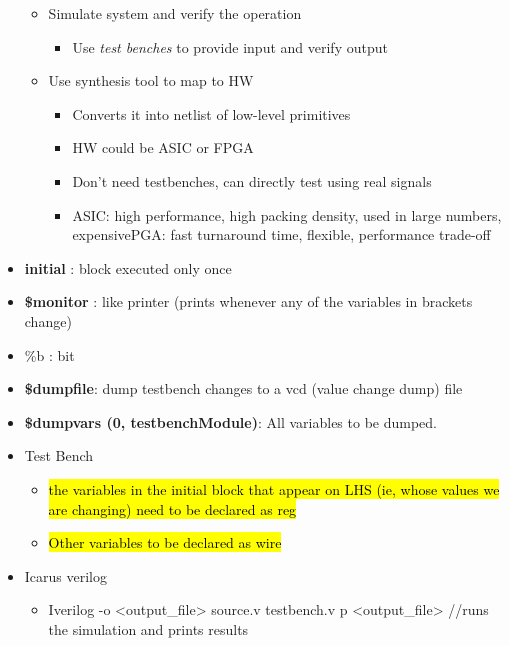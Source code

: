 \documentclass[11pt,twoside,a4paper,titlepage]{article}
\begin{document}
\begin{itemize}
        \begin{itemize}
            \item Simulate system and verify the operation
                \begin{itemize}
                    \item Use \emph{test benches} to provide input and verify output
                \end{itemize}
            \item Use synthesis tool to map to HW
                \begin{itemize}
                    \item Converts it into netlist of low-level primitives
                    \item HW could be ASIC or FPGA
                    \item Don’t need testbenches, can directly test using real signals
                    \item ASIC: high performance, high packing density, used in large numbers, expensivePGA: fast turnaround time, flexible, performance trade-off
                \end{itemize}
        \end{itemize}
    \item \textbf{initial} : block executed only once
    \item \textbf{\$monitor} : like printer (prints whenever any of the variables in brackets change)
    \item \%b : bit
    \item \textbf{\$dumpfile}: dump testbench changes to a vcd (value change dump) file
    \item \textbf{\$dumpvars (0, testbenchModule)}: All variables to be dumped.
    \item Test Bench
        \begin{itemize}
            \item \hl{the variables in the initial block that appear on LHS (ie, whose values we are changing) need to be declared as reg}
            \item \hl{Other variables to be declared as wire}
        \end{itemize}
    \item Icarus verilog
        \begin{itemize}
            \item Iverilog -o <output\_file> source.v testbench.v \textbar p <output\_file>  //runs the simulation and prints results
        \end{itemize}
\end{itemize}
\end{document}
